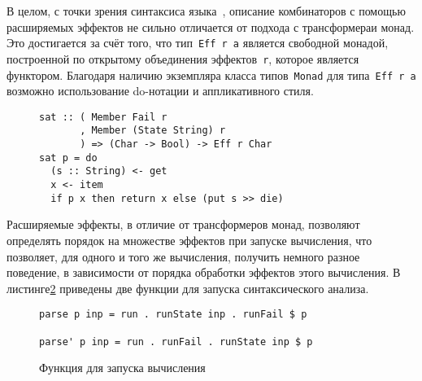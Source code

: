   В целом, с точки зрения синтаксиса языка~, описание 
  комбинаторов с помощью расширяемых эффектов не сильно отличается от 
  подхода с трансформераи монад. Это достигается за счёт того, что 
  тип~\lstinline{Eff r a} является свободной монадой, построенной по открытому 
  объединения эффектов~\lstinline{r}, которое является функтором. Благодаря
  наличию экземпляра класса типов~\lstinline{Monad} для типа~\lstinline{Eff r a}
  возможно использование do-нотации и аппликативного стиля.

  \begin{figure}[h]
  \begin{lstlisting}
sat :: ( Member Fail r
       , Member (State String) r
       ) => (Char -> Bool) -> Eff r Char
sat p = do
  (s :: String) <- get
  x <- item
  if p x then return x else (put s >> die)
  \end{lstlisting}
  \label{listing:extEffSat}
  \end{figure} 

  Расширяемые эффекты, в отличие от трансформеров монад, позволяют определять 
  порядок на множестве эффектов при запуске вычисления, что позволяет, для 
  одного и того же вычисления, получить немного разное поведение, в зависимости от
  порядка обработки эффектов этого вычисления. В листинге\ref{listing:extEffparse}
  приведены две функции для запуска синтаксического анализа. 

  \begin{figure}[h]
  \begin{lstlisting}
parse p inp = run . runState inp . runFail $ p

parse' p inp = run . runFail . runState inp $ p 
  \end{lstlisting}
  \caption{Функция для запуска вычисления}
  \label{listing:extEffparse}
  \end{figure}

